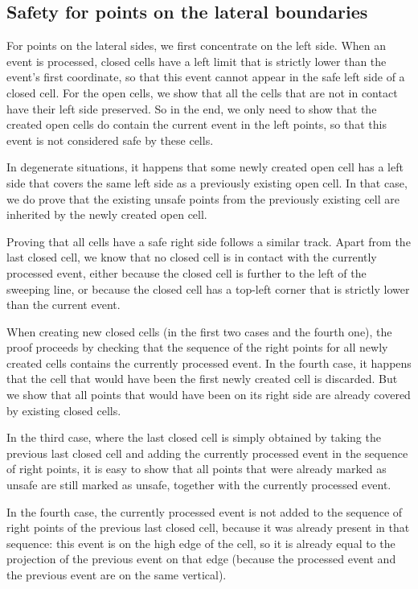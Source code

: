\documentclass[a4paper, USenglish, cleveref, autoref, thm-restate, final]{lipics-v2021}
\begin{document}
\subsection{Safety for points on the lateral boundaries}
For points on the lateral sides, we first concentrate on the left side.
When an event is processed, closed cells have a left limit that is
strictly lower than the event's first coordinate, so that this event cannot appear
in the safe left side of a closed cell.  For the open cells, we show
that all the cells that are not in contact have their left side preserved.
So in the end, we only need to show that the created open cells do contain
the current event in the left points, so that this event is not considered
safe by these cells.

In degenerate situations, it happens that some newly created
open cell has a left side that covers the same left side as a previously
existing open cell.  In that case, we do prove that the existing unsafe points
from the previously existing cell are inherited by the newly
created open cell.

Proving that all cells have a safe right side follows a similar track.
Apart from the last closed cell, we know that no closed cell is in contact
with the currently processed event, either because the closed cell is
further to the left of the sweeping line, or because the closed cell has
a top-left corner that is strictly lower than the current event.

When creating new closed cells (in the first two cases and the fourth one),
the proof proceeds by checking that the sequence of the right points
for all newly created cells contains the currently processed event.
In the fourth case, it happens that the cell that would have been
the first newly created cell is discarded.  But we show that all points
that would have been on its right side are already covered by existing closed
cells.

In the third case, where the last closed cell is simply obtained by
taking the previous last closed cell and adding the currently processed event
in the sequence of right points, it is easy to show that all points
that were already marked as unsafe are still marked as unsafe, together with
the currently processed event.

In the fourth case, the currently processed event is not added to the
sequence of right points of the previous last closed cell, because it
was already present in that sequence: this event is on the high edge of
the cell, so it is already equal to the projection of the previous event
on that edge (because the processed event and the previous event are on
the same vertical).
\end{document}
